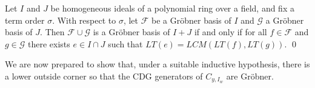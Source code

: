 \begin{lemma}\label{lem:concatinate}\cite[Lemma 1.3.14]{Con93}
Let $I$ and $J$  be  homogeneous ideals of a polynomial ring over a field, and fix a term order $\sigma$.  With respect to $\sigma$, let  $\mathcal{F}$  be  a  Gr\"obner basis of $I$ and $\mathcal{G}$ a Gr\"obner basis of $J$.  Then $\mathcal{F} \cup \mathcal{G}$ is a Gr\"obner basis of $I+J$ if and only if for all $f \in \mathcal{F}$ and $g \in \mathcal{G}$ there exists $e \in I \cap J$ such that $LT(e) = LCM(LT(f),LT(g))$. \qed
\end{lemma}

We are now prepared to show that, under a suitable inductive hypothesis, there is a lower outside corner so that the CDG generators of $C_{y,I_w}$ are Gr\"obner.
